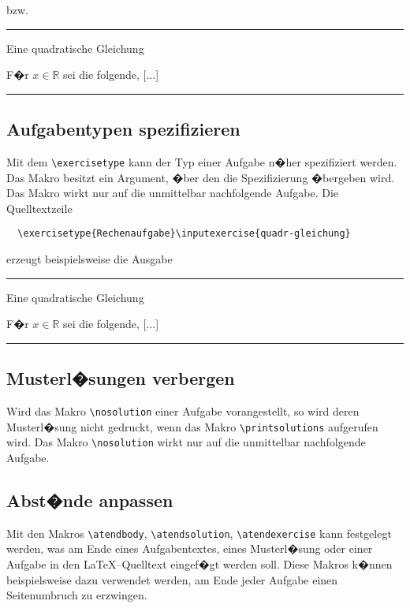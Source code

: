 \noindent bzw.

\vspace*{2em}
\hrule
  \setcounter{exercise}{0}
  \nocontentsline
  \voluntary
  \begin{exercise}{Eine quadratische Gleichung}
    \begin{body}
      F�r $x \in \mathbb{R}$ sei die folgende, [$\dotsc$]
    \end{body}
  \end{exercise}
\hrule
\vspace*{2em}



\subsection{Aufgabentypen spezifizieren}
Mit dem \verb|\exercisetype| kann der Typ einer Aufgabe n�her spezifiziert werden. Das Makro besitzt ein Argument, �ber den die Spezifizierung �bergeben wird. Das Makro wirkt nur auf die unmittelbar nachfolgende Aufgabe. Die Quelltextzeile
\begin{verbatim}
  \exercisetype{Rechenaufgabe}\inputexercise{quadr-gleichung}
\end{verbatim}
erzeugt beispielsweise die Ausgabe
\vspace*{2em}
\hrule
  \setcounter{exercise}{0}
  \nocontentsline
  \begin{exercise}{Eine quadratische Gleichung}
    \begin{body}
      F�r $x \in \mathbb{R}$ sei die folgende, [$\dotsc$]
    \end{body}
  \end{exercise}
\hrule
\vspace*{2em}


\subsection{Musterl�sungen verbergen}
Wird das Makro \verb|\nosolution| einer Aufgabe vorangestellt, so wird deren Musterl�sung nicht gedruckt, wenn das Makro \verb|\printsolutions| aufgerufen wird. Das Makro \verb|\nosolution| wirkt nur auf die unmittelbar nachfolgende Aufgabe.



\subsection{Abst�nde anpassen}
Mit den Makros \verb|\atendbody|, \verb|\atendsolution|, \verb|\atendexercise| kann festgelegt werden, was am Ende eines Aufgabentextes, eines Musterl�sung oder einer Aufgabe in den \LaTeX--Quelltext eingef�gt werden soll. Diese Makros k�nnen beispielsweise dazu verwendet werden, am Ende jeder Aufgabe einen Seitenumbruch zu erzwingen.



